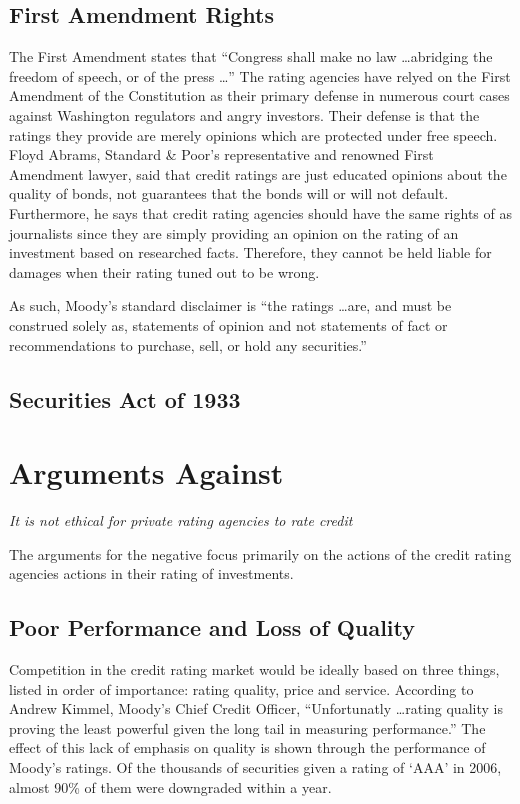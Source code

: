 \documentclass[11pt]{article}
\begin{document}
\begin{multicols}{2}
\subsection{First Amendment Rights}
The First Amendment states that ``Congress shall make no law \ldots abridging the freedom of speech, or of the press \ldots'' The rating agencies have relyed on the First Amendment of the Constitution as their primary defense in numerous court cases against Washington regulators and angry investors. Their defense is that the ratings they provide are merely opinions which are protected under free speech. \cite{CivilLiability, CRS} Floyd Abrams, Standard \& Poor's representative and renowned First Amendment lawyer, said that credit ratings are just educated opinions about the quality of bonds, not guarantees that the bonds will or will not default.  Furthermore, he says that credit rating agencies should have the same rights of as journalists since they are simply providing an opinion on the rating of an investment based on researched facts.  Therefore, they cannot be held liable for damages when their rating tuned out to be wrong.  \cite{nyTimesFirstAmendment} 

As such, Moody's standard disclaimer is ``the ratings \ldots are, and must be construed solely as, statements of opinion and not statements of fact or recommendations to purchase, sell, or hold any securities.'' \cite[p. 120]{govtReport}

\subsection{Securities Act of 1933}


\section{Arguments Against}
\textit{It is not ethical for private rating agencies to rate credit}

The arguments for the negative focus primarily on the actions of the credit rating agencies actions in their rating of investments.

\subsection{Poor Performance and Loss of Quality}
Competition in the credit rating market would be ideally based on three things, listed in order of importance: rating quality, price and service. \cite[p. 210]{govtReport} According to Andrew Kimmel, Moody's Chief Credit Officer, ``Unfortunatly \ldots rating quality is proving the least powerful given the long tail in measuring performance.''  The effect of this lack of emphasis on quality is shown through the performance of Moody's ratings.  Of the thousands of securities given a rating of `AAA' in 2006, almost 90\% of them were downgraded within a year. \cite{ratingEthics, govtReport}


\end{multicols}
\end{document}
